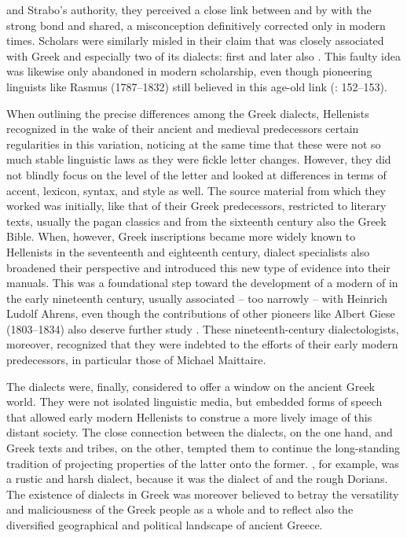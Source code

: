 and Strabo’s authority, they perceived a close link between  and  by  with the strong bond  and  shared, a misconception definitively corrected only in modern times. Scholars were similarly misled in their claim that  was closely associated with Greek and especially two of its dialects: first  and later also . This faulty idea was likewise only abandoned in modern scholarship, even though pioneering linguists like Rasmus \citeauthor{Rask2013} (1787–1832) still believed in this age-old link (\citeyear{Rask2013}: 152–153).

When outlining the precise differences among the Greek dialects, Hellenists recognized in the wake of their ancient and medieval predecessors certain regularities in this variation, noticing at the same time that these were not so much stable linguistic laws as they were fickle letter changes. However, they did not blindly focus on the level of the letter and looked at differences in terms of accent, lexicon, syntax, and style as well. The source material from which they worked was initially, like that of their Greek predecessors, restricted to literary texts, usually the pagan classics and from the sixteenth century also the Greek Bible. When, however, Greek inscriptions became more widely known to Hellenists in the seventeenth and eighteenth century, dialect specialists also broadened their perspective and introduced this new type of evidence into their manuals. This was a foundational step toward the development of a modern  of  in the early nineteenth century, usually associated – too narrowly – with Heinrich Ludolf Ahrens, even though the contributions of other pioneers like Albert Giese (1803–1834) also deserve further study \citep{Giese1837}. These nineteenth-century dialectologists, moreover, recognized that they were indebted to the efforts of their early modern predecessors, in particular those of Michael Maittaire.

The dialects were, finally, considered to offer a window on the ancient Greek world. They were not isolated linguistic media, but embedded forms of speech that allowed early modern Hellenists to construe a more lively image of this distant society. The close connection between the dialects, on the one hand, and Greek texts and tribes, on the other, tempted them to continue the long-standing tradition of projecting properties of the latter onto the former. , for example, was a rustic and harsh dialect, because it was the dialect of  and the rough Dorians. The existence of dialects in Greek was moreover believed to betray the versatility and maliciousness of the Greek people as a whole and to reflect also the diversified geographical and political landscape of ancient Greece.

